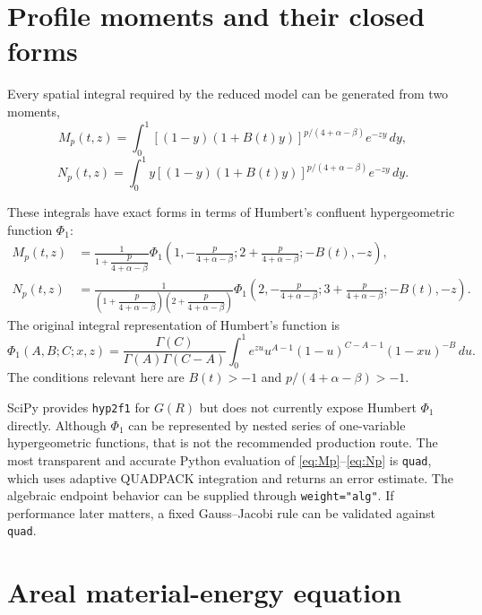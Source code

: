 \documentclass[11pt]{article}
\numberwithin{equation}{section}
\newcommand{\dif}{\,d}
\begin{document}
\section{Profile moments and their closed forms}

Every spatial integral required by the reduced model can be generated from two
moments,
\begin{equation}
 \boxed{
 M_p(t,z)=\int_0^1
 \left[(1-y)(1+B(t)y)\right]^{p/(4+\alpha-\beta)}
 e^{-zy}\dif y,}
 \label{eq:Mp}
\end{equation}
\begin{equation}
 \boxed{
 N_p(t,z)=\int_0^1
 y\left[(1-y)(1+B(t)y)\right]^{p/(4+\alpha-\beta)}
 e^{-zy}\dif y.}
 \label{eq:Np}
\end{equation}

These integrals have exact forms in terms of Humbert's confluent
hypergeometric function $\Phi_1$:
\begin{align}
 M_p(t,z)
 &=\frac{1}{1+\dfrac{p}{4+\alpha-\beta}}
 \Phi_1\!\left(
 1,-\frac{p}{4+\alpha-\beta};
 2+\frac{p}{4+\alpha-\beta};
 -B(t),-z
 \right),
 \label{eq:Mp_humbert}\\
 N_p(t,z)
 &=\frac{1}
 {\left(1+\dfrac{p}{4+\alpha-\beta}\right)
  \left(2+\dfrac{p}{4+\alpha-\beta}\right)}
 \Phi_1\!\left(
 2,-\frac{p}{4+\alpha-\beta};
 3+\frac{p}{4+\alpha-\beta};
 -B(t),-z
 \right).
 \label{eq:Np_humbert}
\end{align}
The original integral representation of Humbert's function is
\begin{equation}
 \boxed{
 \Phi_1(A,B;C;x,z)
 =\frac{\Gamma(C)}{\Gamma(A)\Gamma(C-A)}
 \int_0^1
 e^{zu}u^{A-1}(1-u)^{C-A-1}
 (1-xu)^{-B}\dif u.}
 \label{eq:humbert_integral}
\end{equation}
The conditions relevant here are $B(t)>-1$ and
$p/(4+\alpha-\beta)>-1$.

SciPy provides \texttt{hyp2f1} for $G(R)$ but does not currently expose
Humbert $\Phi_1$ directly.  Although $\Phi_1$ can be represented by nested
series of one-variable hypergeometric functions, that is not the recommended
production route.  The most transparent and accurate Python evaluation of
\eqref{eq:Mp}--\eqref{eq:Np} is
\texttt{quad}, which uses adaptive QUADPACK integration and
returns an error estimate.  The algebraic endpoint behavior can be supplied
through \texttt{weight="alg"}.  If performance later matters, a fixed
Gauss--Jacobi rule can be validated against \texttt{quad}.

\section{Areal material-energy equation}
\end{document}
